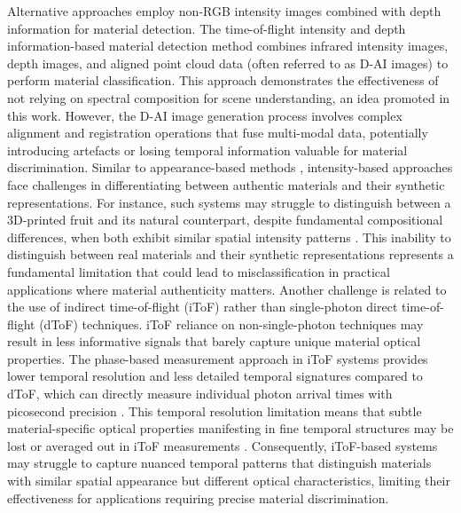 \documentclass[12pt,a4paper,oneside]{report}
\begin{document}
Alternative approaches employ non-RGB intensity images combined with depth information for material detection. The time-of-flight intensity and depth information-based material detection method \cite{sharma2023} combines infrared intensity images, depth images, and aligned point cloud data (often referred to as D-AI images) to perform material classification. This approach demonstrates the effectiveness of not relying on spectral composition for scene understanding, an idea promoted in this work. However, the D-AI image generation process involves complex alignment and registration operations that fuse multi-modal data, potentially introducing artefacts or losing temporal information valuable for material discrimination. Similar to appearance-based methods \cite{schwartz2013,sharan2013,chen2024}, intensity-based approaches face challenges in differentiating between authentic materials and their synthetic representations. For instance, such systems may struggle to distinguish between a 3D-printed fruit and its natural counterpart, despite fundamental compositional differences, when both exhibit similar spatial intensity patterns \cite{su2016,becker2023}. This inability to distinguish between real materials and their synthetic representations represents a fundamental limitation that could lead to misclassification in practical applications where material authenticity matters. Another challenge is related to the use of indirect time-of-flight (iToF) rather than single-photon direct time-of-flight (dToF) techniques. iToF reliance on non-single-photon techniques may result in less informative signals that barely capture unique material optical properties. The phase-based measurement approach in iToF systems provides lower temporal resolution and less detailed temporal signatures compared to dToF, which can directly measure individual photon arrival times with picosecond precision \cite{piron2020}. This temporal resolution limitation means that subtle material-specific optical properties manifesting in fine temporal structures may be lost or averaged out in iToF measurements \cite{su2016,becker2023}. Consequently, iToF-based systems may struggle to capture nuanced temporal patterns that distinguish materials with similar spatial appearance but different optical characteristics, limiting their effectiveness for applications requiring precise material discrimination.
\end{document}
